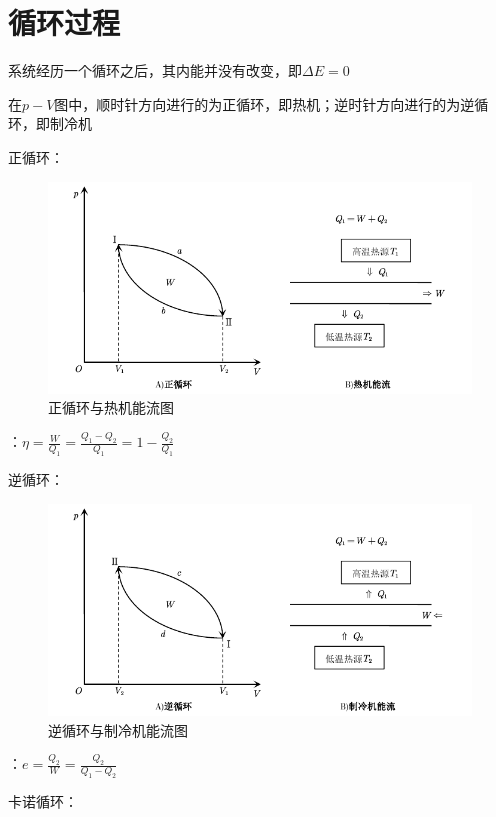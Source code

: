 \documentclass[12pt, a4paper, twoside]{ctexbook}
\begin{document}
\section{循环过程}
系统经历一个循环之后，其内能并没有改变，即$\Delta E=0$

在$p-V$图中，顺时针方向进行的为正循环，即热机；逆时针方向进行的为逆循环，即制冷机

{\sonti 正循环}：
\begin{figure}[H]
    \centerline{\includegraphics[scale=1.2]{正循环与热机能流图.pdf}}
    \caption{正循环与热机能流图}\label{fig:正循环与热机能流图}
\end{figure}
\hspace*{2em}{\sonti 热机效率}：$\eta=\frac{W}{Q_1}=\frac{Q_1-Q_2}{Q_1}=1-\frac{Q_2}{Q_1}$

{\sonti 逆循环}：
\begin{figure}[H]
    \centerline{\includegraphics[scale=1.2]{逆循环与制冷机能流图.pdf}}
    \caption{逆循环与制冷机能流图}\label{fig:逆循环与制冷机能流图}
\end{figure}
\hspace*{2em}{\sonti 制冷系数}：$e=\frac{Q_2}{W}=\frac{Q_2}{Q_1-Q_2}$

{\sonti 卡诺循环}：
\end{document}
